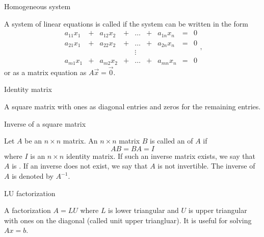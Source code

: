 \documentclass{ximera}
\begin{document}
Homogeneous system 
\begin{expandable}
    A system of linear equations is called  if the system can be written in the form
$$\begin{array}{ccccccccc}
      a_{11}x_1 &+ &a_{12}x_2&+&\ldots&+&a_{1n}x_n&= &0 \\
	 a_{21}x_1 &+ &a_{22}x_2&+&\ldots&+&a_{2n}x_n&= &0 \\
     &&&&\vdots&&&& \\
     a_{m1}x_1 &+ &a_{m2}x_2&+&\ldots&+&a_{mn}x_n&= &0
    \end{array},$$
or as a matrix equation as $A \vec{x} = \vec{0}$.
\end{expandable}


Identity matrix
\begin{expandable}
    A square matrix with ones as diagonal entries and zeros for the remaining entries.
\end{expandable}


Inverse of a square matrix
\begin{expandable}
    Let $A$ be an $n\times n$ matrix.  An $n\times n$ matrix $B$ is called an  of $A$ if 
$$AB=BA=I$$
where $I$ is an $n\times n$ identity matrix.  If such an inverse matrix exists, we say that $A$ is .  If an inverse does not exist, we say that $A$ is not invertible.  The inverse of $A$ is denoted by $A^{-1}$.
\end{expandable}


LU factorization
\begin{expandable}
    A factorization $A=LU$ where $L$ is lower triangular and $U$ is upper triangular with ones on the diagonal (called unit upper triangluar).  It is useful for solving $Ax=b$.
\end{expandable}
\end{document}
